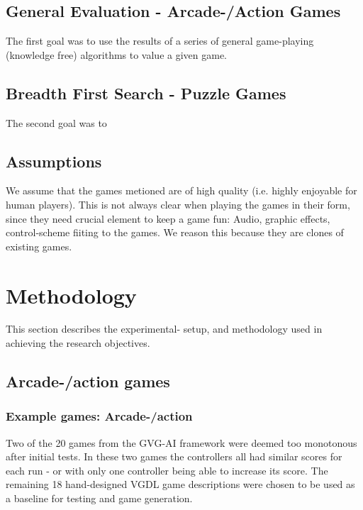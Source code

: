 \documentclass[a4paper,titlepage,final, twoside]{report}
\begin{document}
\section{General Evaluation - Arcade-/Action Games}
The first goal was to use the results of a series of general game-playing (knowledge free) algorithms to value a given game.

\section{Breadth First Search - Puzzle Games}
The second goal was to 

\section{Assumptions}
We assume that the games metioned are of high quality (i.e. highly enjoyable for human players). This is not always clear when playing the games in their form, since they need crucial element to keep a game fun: Audio, graphic effects, control-scheme fiiting to the games.
We reason this because they are clones of existing games.



\chapter{Methodology}
This section describes the experimental- setup, and methodology used in achieving the research objectives.

\section{Arcade-/action games}
\label{sec:actiongames}

\subsection{Example games: Arcade-/action}
Two of the 20 games from the GVG-AI framework were deemed too monotonous after initial tests. 
In these two games the controllers all had similar scores for each run - or with only one controller being able to increase its score.
The remaining 18 hand-designed VGDL game descriptions were chosen to be used as a baseline for testing and game generation. 
\end{document}
